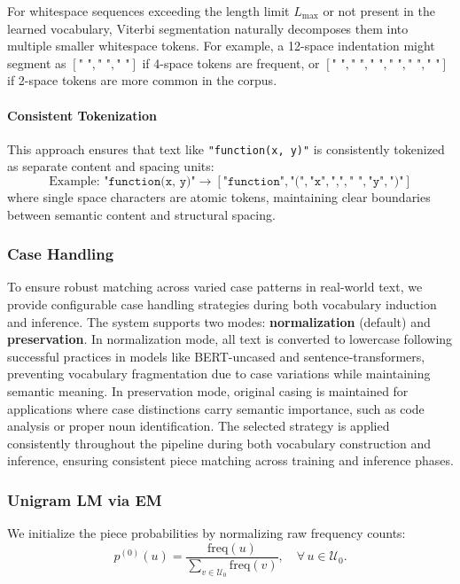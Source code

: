 For whitespace sequences exceeding the length limit $L_{\max}$ or not present in the learned vocabulary, Viterbi segmentation naturally decomposes them into multiple smaller whitespace tokens. For example, a 12-space indentation might segment as $[\texttt{"    "}, \texttt{"    "}, \texttt{"    "}]$ if 4-space tokens are frequent, or $[\texttt{"  "}, \texttt{"  "}, \texttt{"  "}, \texttt{"  "}, \texttt{"  "}, \texttt{"  "}]$ if 2-space tokens are more common in the corpus.

\paragraph{Consistent Tokenization}

This approach ensures that text like \texttt{"function(x, y)"} is consistently tokenized as separate content and spacing units:
\[
\text{Example: } \texttt{"function(x,\ y)"} \rightarrow [\texttt{"function"}, \texttt{"("}, \texttt{"x"}, \texttt{","}, \texttt{" "}, \texttt{"y"}, \texttt{")"}]
\]
where single space characters are atomic tokens, maintaining clear boundaries between semantic content and structural spacing.

\subsubsection{Case Handling}

To ensure robust matching across varied case patterns in real-world text, we provide configurable case handling strategies during both vocabulary induction and inference. The system supports two modes: \textbf{normalization} (default) and \textbf{preservation}. In normalization mode, all text is converted to lowercase following successful practices in models like BERT-uncased and sentence-transformers, preventing vocabulary fragmentation due to case variations while maintaining semantic meaning. In preservation mode, original casing is maintained for applications where case distinctions carry semantic importance, such as code analysis or proper noun identification. The selected strategy is applied consistently throughout the pipeline during both vocabulary construction and inference, ensuring consistent piece matching across training and inference phases.

\subsubsection{Unigram LM via EM}

We initialize the piece probabilities by normalizing raw frequency counts:
\[
p^{(0)}(u)
= \frac{\mathrm{freq}(u)}{\sum_{v\in\mathcal U_{0}}\mathrm{freq}(v)},
\quad
\forall\,u\in\mathcal U_{0}.
\]

